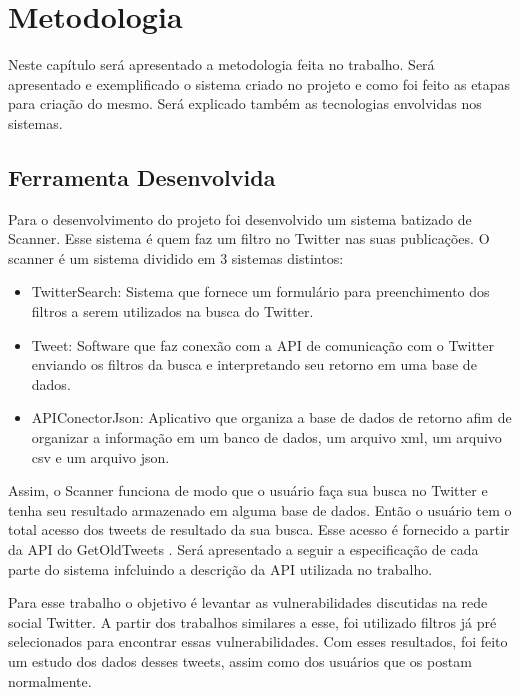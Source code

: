 \chapter[Metodologia]{Metodologia}

Neste capítulo será apresentado a metodologia feita no trabalho. Será apresentado e exemplificado o sistema criado no projeto e como foi feito as etapas para criação do mesmo. Será explicado também as tecnologias envolvidas nos sistemas.

\section{Ferramenta Desenvolvida}
Para o desenvolvimento do projeto foi desenvolvido um sistema batizado de Scanner. Esse sistema é quem faz um filtro no Twitter \cite{JackDorseyNoahGlassBizStone2006} nas suas publicações. O scanner é um sistema dividido em 3 sistemas distintos:

\begin{itemize}
\item TwitterSearch: Sistema que fornece um formulário para preenchimento dos filtros a serem utilizados na busca do Twitter.
\item Tweet: Software que faz conexão com a API de comunicação com o Twitter enviando os filtros da busca e interpretando seu retorno em uma base de dados.
\item APIConectorJson: Aplicativo que organiza a base de dados de retorno afim de organizar a informação em um banco de dados, um arquivo xml, um arquivo csv e um arquivo json.
\end{itemize}

Assim, o Scanner funciona de modo que o usuário faça sua busca no Twitter e tenha seu resultado armazenado em alguma base de dados. Então o usuário tem o total acesso dos tweets de resultado da sua busca. Esse acesso é fornecido a partir da API do GetOldTweets \cite{Pythoncommunity}. Será apresentado a seguir a especificação de cada parte do sistema infcluindo a descrição da API utilizada no trabalho.

Para esse trabalho o objetivo é levantar as vulnerabilidades discutidas na rede social Twitter. A partir dos trabalhos similares a esse, foi utilizado filtros já pré selecionados para encontrar essas vulnerabilidades. Com esses resultados, foi feito um estudo dos dados desses tweets, assim como dos usuários que os postam normalmente.

